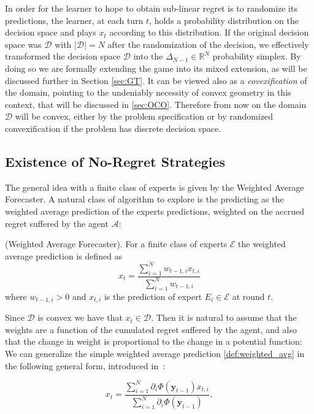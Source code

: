 In order for the learner to hope to obtain sub-linear regret is to randomize its predictions, the learner, at each turn $t$, holds a probability distribution on the decision space and plays $x_t$ according to this distribution. If the original decision space was $\mathcal D$ with $|\mathcal D|=N$ after the randomization of the decision, we effectively transformed the decision space $\mathcal D$ into the $\Delta_{N-1}\in\mathbb R^{N}$ probability simplex. By doing so we are formally extending the game into its mixed extension, as will be discussed further in Section \ref{sec:GT}. It can be viewed also as a \emph{covexification} of the domain, pointing to the undeniably necessity of convex geometry in this context, that will be discussed in \ref{sec:OCO}. Therefore from now on the domain $\mathcal D$ will be convex, either by the problem specification or by randomized convexification if the problem has discrete decision space.

\subsection{Existence of No-Regret Strategies} 
The general idea with a finite class of experts is given by the Weighted Average Forecaster. A natural class of algorithm to explore is the predicting as the weighted average prediction of the experts predictions, weighted on the accrued regret suffered by the agent $\mathcal A$:

\begin{definition}(Weighted Average Forecaster).\label{def:weighted_avg}
For a finite class of experts $\mathcal E$ the weighted average prediction is defined as
\begin{equation}
	x_t = \frac{\sum\limits_{i=1}^{N}w_{t-1,i}x_{t,i}}{\sum\limits_{i=1}^{N}w_{t-1,i}}
\end{equation}
where $w_{t-1,i}>0$ and $x_{t,i}$ is the prediction of expert $E_i\in\mathcal E$ at round $t$. 
\end{definition}

Since $\mathcal D$ is convex we have that $x_t\in\mathcal D$.
Then it is natural to assume that the weights are a function of the cumulated regret suffered by the agent, and also that the change in weight is proportional to the change in a potential function:
We can generalize the simple weighted average prediction \eqref{def:weighted_avg} in the following general form, introduced in~\cite{cesa2003potential}:

\begin{equation}\label{eq:potential_avg}
	x_t = \frac{\sum\limits_{i=1}^{N}\partial_i \Phi(\mathbf y_{t-1}) x_{t,i}}{\sum\limits_{i=1}^{N}\partial_i \Phi(\mathbf y_{t-1}) },
\end{equation}

